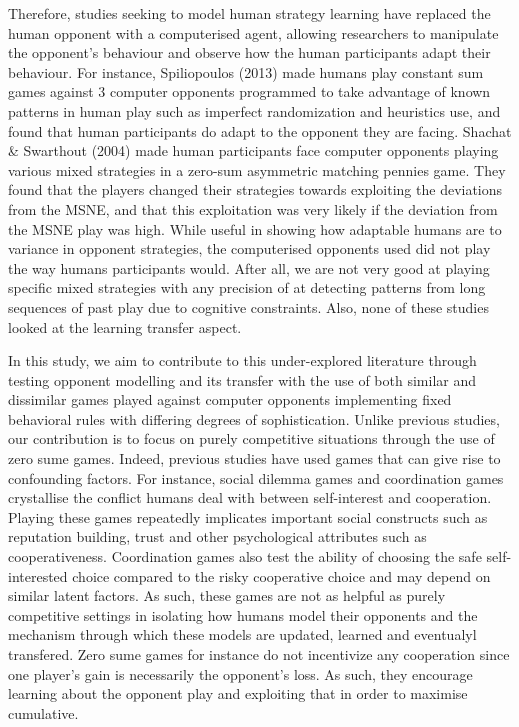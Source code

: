 \documentclass[12pt]{article}         %
\begin{document}
Therefore, studies seeking to model human strategy learning have replaced the human opponent with a computerised agent, allowing researchers to manipulate the opponent's behaviour and observe how the human participants adapt their behaviour. For instance, Spiliopoulos (2013) made humans play constant sum games against 3 computer opponents programmed to take advantage of known patterns in human play such as imperfect randomization and heuristics use, and found that human participants do adapt to the opponent they are facing. Shachat & Swarthout (2004) made human participants face computer opponents playing various mixed strategies in a zero-sum asymmetric matching pennies game. They found that the players changed their strategies towards exploiting the deviations from the MSNE, and that this exploitation was very likely if the deviation from the MSNE play was high. While useful in showing how adaptable humans are to variance in opponent strategies, the computerised opponents used did not play the way humans participants would. After all, we are not very good at playing specific mixed strategies with any precision of at detecting patterns from long sequences of past play due to cognitive constraints. Also, none of these studies looked at the learning transfer aspect.  

In this study, we aim to contribute to this under-explored literature through testing opponent modelling and its transfer with the use of both similar and dissimilar games played against computer opponents implementing fixed behavioral rules with differing degrees of sophistication. Unlike previous studies, our contribution is to focus on purely competitive situations through the use of zero sume games. Indeed, previous studies have used games that can give rise to confounding factors. For instance, social dilemma games and coordination games crystallise the conflict humans deal with between self-interest and cooperation. Playing these games repeatedly implicates important social constructs such as reputation building, trust and other psychological attributes such as cooperativeness. Coordination games also test the ability of choosing the safe self-interested choice compared to the risky cooperative choice and may depend on similar latent factors. As such, these games are not as helpful as purely competitive settings in isolating how humans model their opponents and  the mechanism through which these models are updated, learned and eventualyl transfered. Zero sume games for instance do not incentivize any cooperation since one player's gain is necessarily the opponent's loss. As such, they encourage learning about the opponent play and exploiting that in order to maximise cumulative. 
\end{document}
